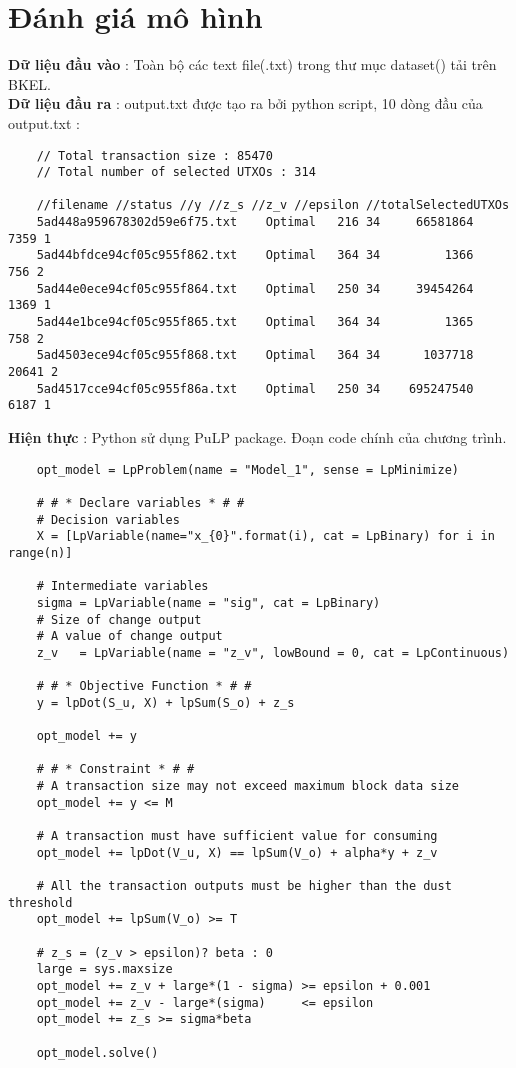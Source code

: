 ﻿\section{Đánh giá mô hình}\label{eval}

\noindent
\textbf{Dữ liệu đầu vào} : Toàn bộ các text file(.txt) trong thư mục dataset() tải trên BKEL.\\
\textbf{Dữ liệu đầu ra}  : output.txt được tạo ra bởi python script, 10 dòng đầu của output.txt :

\begin{lstlisting}
    // Total transaction size : 85470
    // Total number of selected UTXOs : 314
    
    //filename //status //y //z_s //z_v //epsilon //totalSelectedUTXOs
    5ad448a959678302d59e6f75.txt    Optimal   216 34     66581864      7359 1
    5ad44bfdce94cf05c955f862.txt    Optimal   364 34         1366       756 2
    5ad44e0ece94cf05c955f864.txt    Optimal   250 34     39454264      1369 1
    5ad44e1bce94cf05c955f865.txt    Optimal   364 34         1365       758 2
    5ad4503ece94cf05c955f868.txt    Optimal   364 34      1037718     20641 2
    5ad4517cce94cf05c955f86a.txt    Optimal   250 34    695247540      6187 1
\end{lstlisting}

\noindent
\textbf{Hiện thực}  : Python sử dụng PuLP package. Đoạn code chính của chương trình.

\begin{lstlisting}
    opt_model = LpProblem(name = "Model_1", sense = LpMinimize)

    # # * Declare variables * # #
    # Decision variables
    X = [LpVariable(name="x_{0}".format(i), cat = LpBinary) for i in range(n)]

    # Intermediate variables
    sigma = LpVariable(name = "sig", cat = LpBinary)
    # Size of change output
    # A value of change output
    z_v   = LpVariable(name = "z_v", lowBound = 0, cat = LpContinuous)

    # # * Objective Function * # #
    y = lpDot(S_u, X) + lpSum(S_o) + z_s

    opt_model += y

    # # * Constraint * # #
    # A transaction size may not exceed maximum block data size
    opt_model += y <= M

    # A transaction must have sufficient value for consuming
    opt_model += lpDot(V_u, X) == lpSum(V_o) + alpha*y + z_v

    # All the transaction outputs must be higher than the dust threshold
    opt_model += lpSum(V_o) >= T

    # z_s = (z_v > epsilon)? beta : 0
    large = sys.maxsize
    opt_model += z_v + large*(1 - sigma) >= epsilon + 0.001
    opt_model += z_v - large*(sigma)     <= epsilon
    opt_model += z_s >= sigma*beta

    opt_model.solve()
\end{lstlisting}

